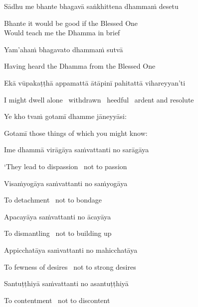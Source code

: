 Sādhu me bhante bhagavā saṅkhittena dhammaṁ desetu

\begin{english}
  Bhante it would be good if the Blessed One\\
  Would teach me the Dhamma in brief
\end{english}

Yam'ahaṁ bhagavato dhammaṁ sutvā

\begin{english}
  Having heard the Dhamma from the Blessed One
\end{english}

Ekā vūpakaṭṭhā appamattā ātāpinī pahitattā vihareyyan'ti

\begin{english}
  I might dwell alone \breathmark\ withdrawn \breathmark\ heedful \breathmark\ ardent and resolute
\end{english}

Ye kho tvaṁ gotamī dhamme jāneyyāsi:

\begin{english}
  Gotamī those things of which you might know:
\end{english}

Ime dhammā virāgāya saṁvattanti no sarāgāya

\begin{english}
  `They lead to dispassion \breathmark\ not to passion
\end{english}

Visaṁyogāya saṁvattanti no saṁyogāya

\begin{english}
  To detachment \breathmark\ not to bondage
\end{english}

Apacayāya saṁvattanti no ācayāya

\begin{english}
  To dismantling \breathmark\ not to building up
\end{english}

Appicchatāya saṁvattanti no mahicchatāya

\begin{english}
  To fewness of desires \breathmark\ not to strong desires
\end{english}

Santuṭṭhiyā saṁvattanti no asantuṭṭhiyā

\begin{english}
  To contentment \breathmark\ not to discontent
\end{english}

